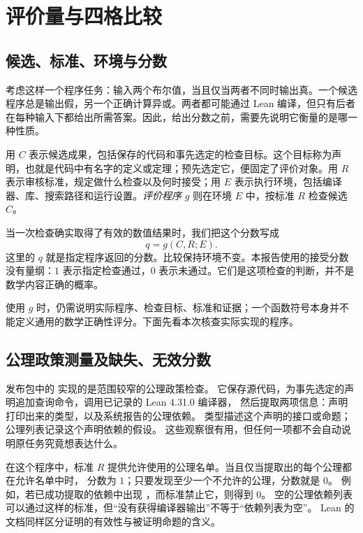 \section{评价量与四格比较}
\label{sec:framework}

\subsection{候选、标准、环境与分数}
\label{subsec:score}

考虑这样一个程序任务：输入两个布尔值，当且仅当两者不同时输出真。一个候选程序总是输出假，另一个正确计算异或。两者都可能通过 Lean 编译，但只有后者在每种输入下都给出所需答案。因此，给出分数之前，需要先说明它衡量的是哪一种性质。

用 $C$ 表示候选成果，包括保存的代码和事先选定的检查目标。这个目标称为声明，也就是代码中有名字的定义或定理；预先选定它，便固定了评价对象。用 $R$ 表示审核标准，规定做什么检查以及何时接受；用 $E$ 表示执行环境，包括编译器、库、搜索路径和运行设置。\emph{评价程序} $g$ 则在环境 $E$ 中，按标准 $R$ 检查候选 $C$。

当一次检查确实取得了有效的数值结果时，我们把这个分数写成
\[
q=g(C,R;E).
\]
这里的 $q$ 就是指定程序返回的分数。比较保持环境不变。本报告使用的接受分数没有量纲：$1$ 表示指定检查通过，$0$ 表示未通过。它们是这项检查的判断，并不是数学内容正确的概率。

使用 $g$ 时，仍需说明实际程序、检查目标、标准和证据；一个函数符号本身并不能定义通用的数学正确性评分。下面先看本次核查实际实现的程序。

\subsection{公理政策测量及缺失、无效分数}
\label{subsec:measurement-status}

发布包中的  实现的是范围较窄的公理政策检查。
它保存源代码，为事先选定的声明追加查询命令，调用已记录的 Lean 4.31.0 编译器，
然后提取两项信息：声明打印出来的类型，以及系统报告的公理依赖。
类型描述这个声明的接口或命题；公理列表记录这个声明依赖的假设。
这些观察很有用，但任何一项都不会自动说明原任务究竟想表达什么。

在这个程序中，标准 $R$ 提供允许使用的公理名单。当且仅当提取出的每个公理都在允许名单中时，
分数为 $1$；只要发现至少一个不允许的公理，分数就是 $0$。
例如，若已成功提取的依赖中出现 ，而标准禁止它，则得到 $0$。
空的公理依赖列表可以通过这样的标准，但“没有获得编译器输出”不等于“依赖列表为空”。
Lean 的文档同样区分证明的有效性与被证明命题的含义。\cite{leanvalidation}

